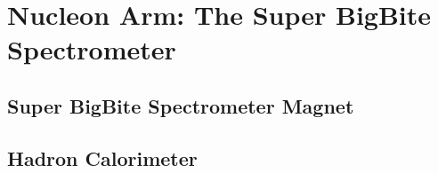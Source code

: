\section{Nucleon Arm: The Super BigBite Spectrometer}

\subsection{Super BigBite Spectrometer Magnet}

\subsection{Hadron Calorimeter}
